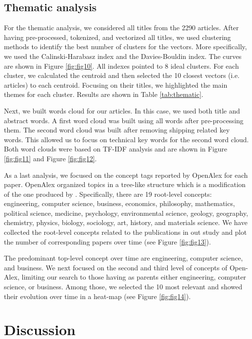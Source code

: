 \documentclass[jmse,review,submit,pdftex,moreauthors]{Definitions/mdpi}
\begin{document}
\subsection{Thematic analysis}
For the thematic analysis, we considered all titles from the 2290 articles. After having pre-processed, tokenized, and vectorized all titles, we used clustering methods to identify the best number of clusters for the vectors. More specifically, we used the Calinski-Harabasz index and the Davies-Bouldin index. The curves are shown in Figure \ref{fig:fig10}. All indexes pointed to 8 ideal clusters. For each cluster, we calculated the centroid and then selected the 10 closest vectors (i.e. articles) to each centroid. Focusing on their titles, we highlighted the main themes for each cluster. Results are shown in Table \ref{tab:thematic}.

Next, we built words cloud for our articles. In this case, we used both title and abstract words. A first word cloud was built using all words after pre-processing them. The second word cloud was built after removing shipping related key words. This allowed us to focus on technical key words for the second word cloud. Both word clouds were based on TF-IDF analysis and are shown in Figure \ref{fig:fig11} and Figure \ref{fig:fig12}.

As a last analysis, we focused on the concept tags reported by OpenAlex for each paper. OpenAlex organized topics in a tree-like structure which is a modification of the one produced by \citep{shen2018web}. Specifically, there are 19 root-level concepts: engineering, computer science, business, economics, philosophy, mathematics, political science, medicine, psychology, environmental science, geology, geography, chemistry, physics, biology, sociology, art, history, and materials science. We have collected the root-level concepts related to the publications in out study and plot the number of corresponding papers over time (see Figure \ref{fig:fig13}).

The predominant top-level concept over time are engineering, computer science, and business. We next focused on the second and third level of concepts of Open-Alex, limiting our search to those having as parents either engineering, computer science, or business. Among those, we selected the 10 most relevant and showed their evolution over time in a heat-map (see Figure \ref{fig:fig14}).

\section{Discussion}
\end{document}
